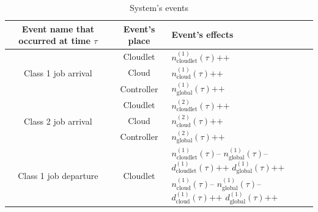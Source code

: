 \documentclass[10pt,a4paper]{article}
\begin{document}
\begin{table}[h!]
    \caption{System's events}
    \begin{adjustbox}{center=\textwidth}
    \label{table:SystemEvents}
     \begin{tabular}{c|c|p{2.5cm}}

      \toprule
      \textbf{Event name that occurred at time $\tau$} & \textbf{Event's place} & \textbf{Event's effects} \\
      \midrule
      
      \multirow{3}{*}{Class 1 job arrival} & Cloudlet & $n_{\text{cloudlet}}^{(1)}(\tau)\texttt{++}$ \\ \cline{2-3} 
      & Cloud & $n_{\text{cloud}}^{(1)}(\tau)\texttt{++}$ \\ \cline{2-3} 
      & Controller & $n_{\text{global}}^{(1)}(\tau)\texttt{++}$ \\ 
       
      \hline
       
      \multirow{3}{*}{Class 2 job arrival} & Cloudlet & $n_{\text{cloudlet}}^{(2)}(\tau)\texttt{++}$ \\ \cline{2-3} 
      & Cloud & $n_{\text{cloud}}^{(2)}(\tau)\texttt{++}$ \\ \cline{2-3} 
      & Controller & $n_{\text{global}}^{(2)}(\tau)\texttt{++}$ \\ 
    
	  \hline
       
      \multirow{8}{*}{Class 1 job departure} & \multirow{4}{*}{Cloudlet} & $n_{\text{cloudlet}}^{(1)}(\tau)\texttt{--}$ \newline $n_{\text{global}}^{(1)}(\tau)\texttt{--}$ \newline $d_{\text{cloudlet}}^{(1)}(\tau)\texttt{++}$ \newline $d_{\text{global}}^{(1)}(\tau)\texttt{++}$ \\ \cline{2-3} 
      & \multirow{4}{*}{Cloud} & $n_{\text{cloud}}^{(1)}(\tau)\texttt{--}$ \newline $n_{\text{global}}^{(1)}(\tau)\texttt{--}$ \newline $d_{\text{cloud}}^{(1)}(\tau)\texttt{++}$ \newline $d_{\text{global}}^{(1)}(\tau)\texttt{++}$ \\ \cline{2-3} 
 
 		\hline
       

\end{tabular}
\end{adjustbox}
\end{table}
\end{document}
